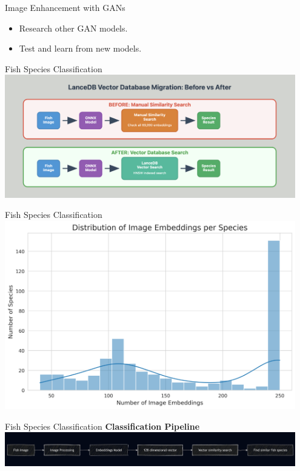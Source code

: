 \begin{frame}{Image Enhancement with GANs}
    \begin{itemize}
        \item Research other GAN models.
        \item Test and learn from new models.
    \end{itemize}
\end{frame}

\begin{frame}{Fish Species Classification}
    \centering
    \includegraphics[height=0.8\textheight,width=0.95\textwidth,keepaspectratio]{images/vectordb_migration.png}
\end{frame}

\begin{frame}{Fish Species Classification}
    \centering
    \includegraphics[height=0.8\textheight,width=0.95\textwidth,keepaspectratio]{images/embedding_distribution_histogram.png}
\end{frame}

\begin{frame}{Fish Species Classification}
    \centering
    \textbf{\LARGE Classification Pipeline} \\[1em]
    \includegraphics[height=0.8\textheight, width=0.95\textwidth, keepaspectratio]{images/classification_pipe.png}
\end{frame}

